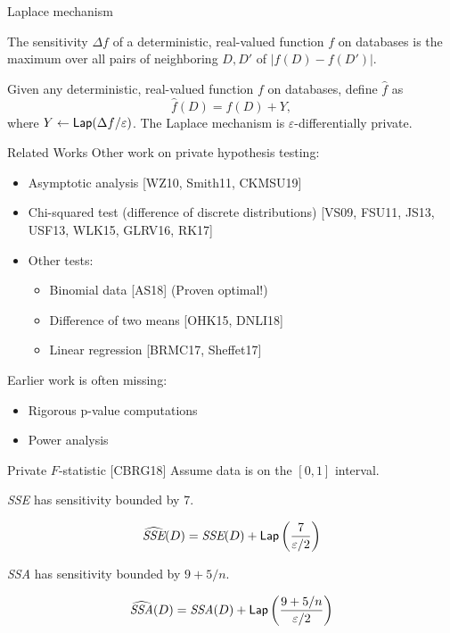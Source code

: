 \documentclass{beamer}
\newcommand{\sse}{\textit{SSE}\xspace}
\newcommand{\ssa}{\textit{SSA}\xspace}
\newcommand{\lap}{\ensuremath{{\sf Lap}}\xspace}
\begin{document}
\begin{frame}{Laplace mechanism}
\pause
\begin{definition}[Sensitivity]
The sensitivity $\Delta f$ of a deterministic, real-valued function $f$ on databases is the maximum over all pairs of neighboring $D, D'$ of $| f(D) - f(D') |$.
\end{definition}

\pause
\begin{theorem}
Given any deterministic, real-valued function $f$ on databases, define $\widehat{f}$ as
$$\widehat{f}(D) = f(D) + Y,$$
where $Y \leftarrow \lap(\Delta f/\varepsilon)$. The Laplace mechanism is $\varepsilon$-differentially private.
\end{theorem}
\end{frame}

\begin{frame}{Related Works}
    Other work on private hypothesis testing:\pause
\begin{itemize}
\item Asymptotic analysis [WZ10, Smith11, CKMSU19] \pause
\item Chi-squared test (difference of discrete distributions) [VS09, FSU11, JS13, USF13, WLK15, GLRV16, RK17] \pause
\item Other tests: \pause
\begin{itemize}
\item Binomial data [AS18] (Proven optimal!) \pause
\item Difference of two means [OHK15, DNLI18] \pause
\item Linear regression [BRMC17, Sheffet17] \pause
\end{itemize}
\end{itemize}
Earlier work is often missing: \pause
\begin{itemize}
\item Rigorous p-value computations \pause
\item Power analysis
\end{itemize}
\end{frame}

\begin{frame}{Private $F$-statistic [CBRG18]}
\pause
Assume data is on the $[0,1]$ interval. \pause
\begin{theorem}
\sse has sensitivity bounded by 7.
\end{theorem}
\pause
$$\widehat{\sse}(D) = \sse(D) + \lap\left(\frac{7}{\varepsilon/2}\right) $$
\pause
\begin{theorem}
\ssa has sensitivity bounded by $9 + 5/n$.
\end{theorem}
\pause
$$\widehat{\ssa}(D) = \ssa(D) + \lap\left(\frac{9+5/n}{\varepsilon/2}\right) $$
\end{frame}
\end{document}
